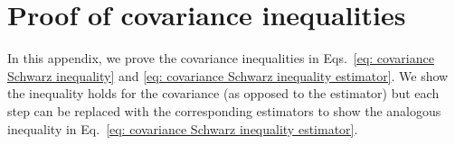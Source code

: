 \documentclass[%
 reprint,
 amsmath,amssymb,
 aps,nofootinbib,nobibnotes,onecolumn,prd
]{revtex4-2}
\begin{document}

\section{Proof of covariance inequalities}
\label{app: covariance cauchy-Schwarz}

In this appendix, we prove the covariance inequalities in Eqs.~\ref{eq: covariance Schwarz inequality} and \ref{eq: covariance Schwarz inequality estimator}. We show the inequality holds for the covariance (as opposed to the estimator) but each step can be replaced with the corresponding estimators to show the analogous inequality in Eq.~\ref{eq: covariance Schwarz inequality estimator}.
\end{document}
